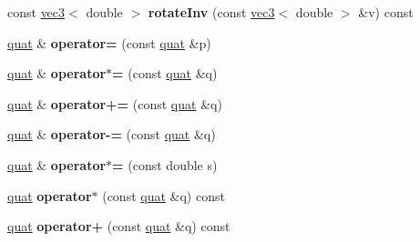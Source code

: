 \begin{DoxyCompactItemize}
\item 
\hypertarget{classmath_1_1quat_a353cb34c614b52458b01e9c6f670a23b}{
const \hyperlink{classmath_1_1vec3}{vec3}$<$ double $>$ {\bfseries rotateInv} (const \hyperlink{classmath_1_1vec3}{vec3}$<$ double $>$ \&v) const }
\label{classmath_1_1quat_a353cb34c614b52458b01e9c6f670a23b}

\item 
\hypertarget{classmath_1_1quat_a48e1ed6e39b26ae68cb974c9a988a48a}{
\hyperlink{classmath_1_1quat}{quat} \& {\bfseries operator=} (const \hyperlink{classmath_1_1quat}{quat} \&p)}
\label{classmath_1_1quat_a48e1ed6e39b26ae68cb974c9a988a48a}

\item 
\hypertarget{classmath_1_1quat_ad513e1cf94dbf267ca96438b8daab96c}{
\hyperlink{classmath_1_1quat}{quat} \& {\bfseries operator$\ast$=} (const \hyperlink{classmath_1_1quat}{quat} \&q)}
\label{classmath_1_1quat_ad513e1cf94dbf267ca96438b8daab96c}

\item 
\hypertarget{classmath_1_1quat_a06ce7926b99c59ec5f7a76b17fb25afd}{
\hyperlink{classmath_1_1quat}{quat} \& {\bfseries operator+=} (const \hyperlink{classmath_1_1quat}{quat} \&q)}
\label{classmath_1_1quat_a06ce7926b99c59ec5f7a76b17fb25afd}

\item 
\hypertarget{classmath_1_1quat_a2b4e165cac4e236d982a6875714d35eb}{
\hyperlink{classmath_1_1quat}{quat} \& {\bfseries operator-\/=} (const \hyperlink{classmath_1_1quat}{quat} \&q)}
\label{classmath_1_1quat_a2b4e165cac4e236d982a6875714d35eb}

\item 
\hypertarget{classmath_1_1quat_a70a3d5a7c1bbe37b9aad5d37569034a6}{
\hyperlink{classmath_1_1quat}{quat} \& {\bfseries operator$\ast$=} (const double s)}
\label{classmath_1_1quat_a70a3d5a7c1bbe37b9aad5d37569034a6}

\item 
\hypertarget{classmath_1_1quat_ae5fb9d185a79aa41cfffe113f681be8e}{
\hyperlink{classmath_1_1quat}{quat} {\bfseries operator$\ast$} (const \hyperlink{classmath_1_1quat}{quat} \&q) const }
\label{classmath_1_1quat_ae5fb9d185a79aa41cfffe113f681be8e}

\item 
\hypertarget{classmath_1_1quat_a524b92bd8463f3262d7c8be5e439f3f5}{
\hyperlink{classmath_1_1quat}{quat} {\bfseries operator+} (const \hyperlink{classmath_1_1quat}{quat} \&q) const }
\label{classmath_1_1quat_a524b92bd8463f3262d7c8be5e439f3f5}


\end{DoxyCompactItemize}
